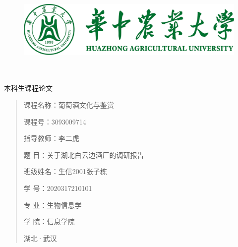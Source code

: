 \documentclass[UTF8]{ctexart}
\date{}
\begin{document}
	\begin{figure}[t]
		\centering
        \includegraphics[scale=0.7]{img/HZAU.png}
	\end{figure}

	\begin{center}
		\quad \\
		\quad \\
		\heiti \fontsize{45}{17} 本科生课程论文
	\end{center}
	\vskip 3.0cm

	\begin{quotation}
		\heiti \fontsize{15}{15}
		\doublespacing
		\par\setlength\parindent{12em}
		\quad

		课程名称：葡萄酒文化与鉴赏

		课\hspace{0.16cm}程\hspace{0.16cm}号：3093009714
		
		指导教师：李二虎

		题\hspace{0.61cm} 目：关于湖北白云边酒厂的调研报告

		班级姓名：生信2001张子栋

		学\hspace{0.61cm} 号：2020317210101

		专\hspace{0.61cm} 业：生物信息学

		学\hspace{0.61cm} 院：信息学院

		

		\vskip 2cm
		\centering
        湖北·武汉
	\end{quotation}
\end{document}
